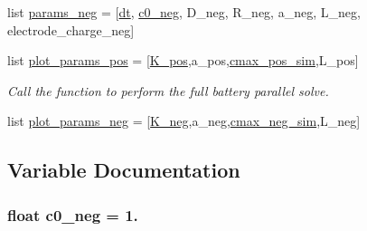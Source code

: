 \begin{DoxyCompactItemize}
\item 
list \hyperlink{namespaceuser__input__full__battery___g_i_t_t_a0bd2f9c022b04c151ac8c0ad19eadd67}{params\-\_\-neg} = \mbox{[}\hyperlink{namespaceuser__input__full__battery___g_i_t_t_a778e38aa889751afffa2dea6b803e67a}{dt}, \hyperlink{namespaceuser__input__full__battery___g_i_t_t_ad1f2e3ea1e8872b82ad0a3f8b86f0769}{c0\-\_\-neg}, D\-\_\-neg, R\-\_\-neg, a\-\_\-neg, L\-\_\-neg, electrode\-\_\-charge\-\_\-neg\mbox{]}
\item 
list \hyperlink{namespaceuser__input__full__battery___g_i_t_t_a5bacef25baf63731923fbef674af4e9d}{plot\-\_\-params\-\_\-pos} = \mbox{[}\hyperlink{namespaceuser__input__full__battery___g_i_t_t_ab1a8ebec490ba1301f818bd1c5f1f3fa}{K\-\_\-pos},a\-\_\-pos,\hyperlink{namespaceuser__input__full__battery___g_i_t_t_aa5b015cc7d0bda453c6163023448db72}{cmax\-\_\-pos\-\_\-sim},L\-\_\-pos\mbox{]}
\begin{DoxyCompactList}\small\item\em Call the function to perform the full battery parallel solve. \end{DoxyCompactList}\item 
list \hyperlink{namespaceuser__input__full__battery___g_i_t_t_a0861e0e85d9d6139e0cc3cc1cc4fa692}{plot\-\_\-params\-\_\-neg} = \mbox{[}\hyperlink{namespaceuser__input__full__battery___g_i_t_t_a64d0c5854299798787675bc91586023c}{K\-\_\-neg},a\-\_\-neg,\hyperlink{namespaceuser__input__full__battery___g_i_t_t_ab7633a5e9c70aabfe6992e4fe521a1f9}{cmax\-\_\-neg\-\_\-sim},L\-\_\-neg\mbox{]}
\end{DoxyCompactItemize}


\subsection{Variable Documentation}
\hypertarget{namespaceuser__input__full__battery___g_i_t_t_ad1f2e3ea1e8872b82ad0a3f8b86f0769}{
\subsubsection[{c0\-\_\-neg}]{\setlength{\rightskip}{0pt plus 5cm}float c0\-\_\-neg = 1.}}\label{namespaceuser__input__full__battery___g_i_t_t_ad1f2e3ea1e8872b82ad0a3f8b86f0769}


